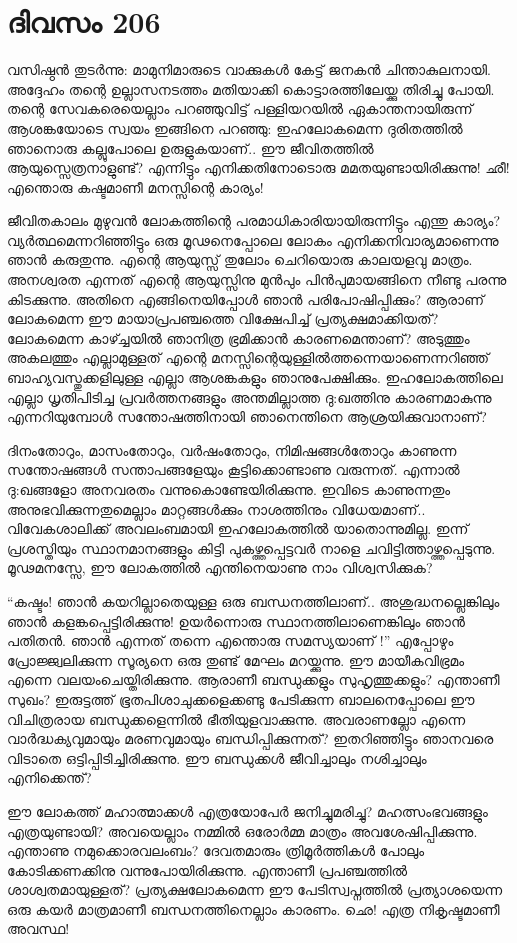 \section{ദിവസം 206}


വസിഷ്ഠൻ തുടർന്നു: മാമുനിമാരുടെ വാക്കുകൾ കേട്ട് ജനകൻ ചിന്താകുലനായി. അദ്ദേഹം തന്റെ ഉല്ലാസനടത്തം മതിയാക്കി കൊട്ടാരത്തിലേയ്ക്കു തിരിച്ചു പോയി. തന്റെ സേവകരെയെല്ലാം പറഞ്ഞുവിട്ട് പള്ളിയറയിൽ ഏകാന്തനായിരുന്ന് ആശങ്കയോടെ സ്വയം ഇങ്ങിനെ  പറഞ്ഞു: ഇഹലോകമെന്ന ദുരിതത്തിൽ ഞാനൊരു കല്ലുപോലെ ഉരുളുകയാണ്‌.. ഈ ജീവിതത്തിൽ ആയുസ്സെത്രനാളുണ്ട്? എന്നിട്ടും എനിക്കതിനോടൊരു മമതയുണ്ടായിരിക്കുന്നു! ഛീ! എന്തൊരു കഷ്ടമാണീ മനസ്സിന്റെ കാര്യം!

ജീവിതകാലം മുഴുവൻ ലോകത്തിന്റെ പരമാധികാരിയായിരുന്നിട്ടും എന്തു കാര്യം? വ്യര്‍ത്ഥമെന്നറിഞ്ഞിട്ടും  ഒരു മൂഢനെപ്പോലെ ലോകം എനിക്കനിവാര്യമാണെന്നു ഞാൻ കരുതുന്നു. എന്റെ ആയുസ്സ്  തുലോം ചെറിയൊരു കാലയളവു മാത്രം. അനശ്വരത എന്നത് എന്റെ ആയുസ്സിനു മുൻപും പിൻപുമായങ്ങിനെ നീണ്ടു പരന്നു കിടക്കുന്നു. അതിനെ  എങ്ങിനെയിപ്പോൾ ഞാൻ പരിപോഷിപ്പിക്കും? ആരാണ്‌ ലോകമെന്ന ഈ മായാപ്രപഞ്ചത്തെ വിക്ഷേപിച്ച് പ്രത്യക്ഷമാക്കിയത്? ലോകമെന്ന കാഴ്ച്ചയിൽ ഞാനിത്ര ഭ്രമിക്കാൻ കാരണമെന്താണ്‌? അടുത്തും അകലത്തും എല്ലാമുള്ളത് എന്റെ മനസ്സിന്റെയുള്ളിൽത്തന്നെയാണെന്നറിഞ്ഞ് ബാഹ്യവസ്തുക്കളിലുള്ള എല്ലാ ആശങ്കകളും ഞാനുപേക്ഷിക്കും. ഇഹലോകത്തിലെ എല്ലാ ധൃതിപിടിച്ച പ്രവർത്തനങ്ങളും അന്തമില്ലാത്ത ദു:ഖത്തിനു കാരണമാകുന്നു എന്നറിയുമ്പോൾ സന്തോഷത്തിനായി ഞാനെന്തിനെ ആശ്രയിക്കുവാനാണ്‌?

ദിനംതോറും, മാസംതോറും, വർഷംതോറും, നിമിഷങ്ങൾതോറും കാണുന്ന സന്തോഷങ്ങൾ സന്താപങ്ങളേയും കൂട്ടിക്കൊണ്ടാണു വരുന്നത്. എന്നാൽ ദു:ഖങ്ങളോ അനവരതം വന്നുകൊണ്ടേയിരിക്കുന്നു. ഇവിടെ കാണുന്നതും അനുഭവിക്കുന്നതുമെല്ലാം മാറ്റങ്ങൾക്കും നാശത്തിനും വിധേയമാണ്‌.. വിവേകശാലിക്ക് അവലംബമായി ഇഹലോകത്തിൽ യാതൊന്നുമില്ല. ഇന്ന് പ്രശസ്തിയും സ്ഥാനമാനങ്ങളും കിട്ടി പുകഴ്ത്തപ്പെട്ടവർ നാളെ ചവിട്ടിത്താഴ്ത്തപ്പെടുന്നു. മൂഢമനസ്സേ, ഈ ലോകത്തിൽ എന്തിനെയാണു നാം വിശ്വസിക്കുക?

“കഷ്ടം! ഞാൻ കയറില്ലാതെയുള്ള ഒരു ബന്ധനത്തിലാണ്‌.. അശുദ്ധനല്ലെങ്കിലും ഞാൻ കളങ്കപ്പെട്ടിരിക്കുന്നു! ഉയർന്നൊരു സ്ഥാനത്തിലാണെങ്കിലും ഞാൻ പതിതൻ. ഞാൻ എന്നത് തന്നെ എന്തൊരു സമസ്യയാണ് !” എപ്പോഴും പ്രോജ്ജ്വലിക്കുന്ന സൂര്യനെ ഒരു തുണ്ട് മേഘം മറയ്ക്കുന്നു. ഈ മായീകവിഭ്രമം എന്നെ വലയംചെയ്തിരിക്കുന്നു. ആരാണീ ബന്ധുക്കളും സുഹൃത്തുക്കളും? എന്താണീ സുഖം? ഇരുട്ടത്ത് ഭൂതപിശാചുക്കളെക്കണ്ടു പേടിക്കുന്ന ബാലനെപ്പോലെ ഈ വിചിത്രരായ ബന്ധുക്കളെന്നിൽ ഭീതിയുളവാക്കുന്നു. അവരാണല്ലോ എന്നെ വാർദ്ധക്യവുമായും മരണവുമായും ബന്ധിപ്പിക്കുന്നത്? ഇതറിഞ്ഞിട്ടും ഞാനവരെ വിടാതെ ഒട്ടിപ്പിടിച്ചിരിക്കുന്നു. ഈ ബന്ധുക്കൾ ജീവിച്ചാലും നശിച്ചാലും എനിക്കെന്ത്?

ഈ ലോകത്ത് മഹാത്മാക്കൾ എത്രയോപേർ ജനിച്ചുമരിച്ചു? മഹത്സംഭവങ്ങളും എത്രയുണ്ടായി? അവയെല്ലാം നമ്മില്‍  ഒരോർമ്മ മാത്രം അവശേഷിപ്പിക്കുന്നു. എന്താണു നമുക്കൊരവലംബം? ദേവതമാരും ത്രിമൂർത്തികൾ പോലും കോടിക്കണക്കിനു വന്നുപോയിരിക്കുന്നു. എന്താണീ പ്രപഞ്ചത്തിൽ ശാശ്വതമായുള്ളത്?  പ്രത്യക്ഷലോകമെന്ന ഈ പേടിസ്വപ്നത്തിൽ പ്രത്യാശയെന്ന ഒരു കയർ മാത്രമാണീ ബന്ധനത്തിനെല്ലാം കാരണം. ഛെ! എത്ര നികൃഷ്ടമാണീ അവസ്ഥ!

